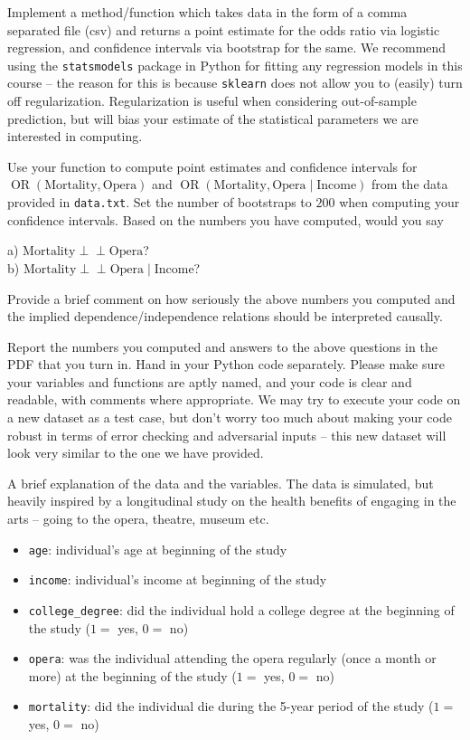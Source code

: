 \documentclass[letterpaper, 11pt]{article}
\DeclareMathOperator{\odds}{\text{OR}}
\def\ci{\perp\!\!\!\perp}
\begin{document}
Implement a method/function which takes data in the form of a comma separated file (csv) and returns a point estimate for the odds ratio via logistic regression, and confidence intervals via bootstrap for the same. We recommend using the \texttt{statsmodels} package in Python for fitting any regression models in this course -- the reason for this is because \texttt{sklearn} does not allow you to (easily) turn off regularization. Regularization is useful when considering out-of-sample prediction, but will bias your estimate of the statistical parameters we are interested in computing.

Use your function to compute point estimates and confidence intervals for \linebreak $\odds(\text{Mortality}, \text{Opera})$ and $\odds(\text{Mortality}, \text{Opera} \mid \text{Income})$ from the data provided in \texttt{data.txt}. Set the number of bootstraps to $200$ when computing your confidence intervals. Based on the numbers you have computed, would you say\

a) $\text{Mortality} \ci \text{Opera}$?\\
b) $\text{Mortality} \ci \text{Opera} \mid \text{Income}$?

Provide a brief comment on how seriously the above numbers you computed and the implied dependence/independence relations should be interpreted causally.

Report the numbers you computed and answers to the above questions in the PDF that you turn in. Hand in your Python code separately. Please make sure your variables and functions are aptly named, and your code is clear and readable, with comments where appropriate. We may try to execute your code on a new dataset as a test case, but don't worry too much about making your code robust in terms of error checking and adversarial inputs -- this new dataset will look very similar to the one we have provided.

A brief explanation of the data and the variables. The data is simulated, but heavily inspired by a longitudinal study on the health benefits of engaging in the arts -- going to the opera, theatre, museum etc.
\begin{itemize}
	\item \texttt{age}: individual's age at beginning of the study
	\item \texttt{income}: individual's income at beginning of the study
	\item \texttt{college\_degree}: did the individual hold a college degree at the beginning of the study ($1=$ yes, $0=$ no)
	\item \texttt{opera}: was the individual attending the opera regularly (once a month or more) at the beginning of the study ($1=$ yes, $0=$ no)
	\item \texttt{mortality}: did the individual die during the 5-year period of the study ($1=$ yes, $0=$ no)
\end{itemize}
\end{document}
